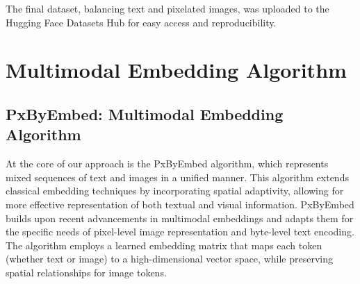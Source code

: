 \documentclass[10pt,a4paper]{article}
\begin{document}
The final dataset, balancing text and pixelated images, was uploaded to the Hugging Face Datasets Hub for easy access and reproducibility.

\section{Multimodal Embedding Algorithm}

\subsection{PxByEmbed: Multimodal Embedding Algorithm}

At the core of our approach is the PxByEmbed algorithm, which represents mixed sequences of text and images in a unified manner. This algorithm extends classical embedding techniques by incorporating spatial adaptivity, allowing for more effective representation of both textual and visual information. PxByEmbed builds upon recent advancements in multimodal embeddings \cite{kiela2018learning} and adapts them for the specific needs of pixel-level image representation and byte-level text encoding. The algorithm employs a learned embedding matrix that maps each token (whether text or image) to a high-dimensional vector space, while preserving spatial relationships for image tokens.
\end{document}

